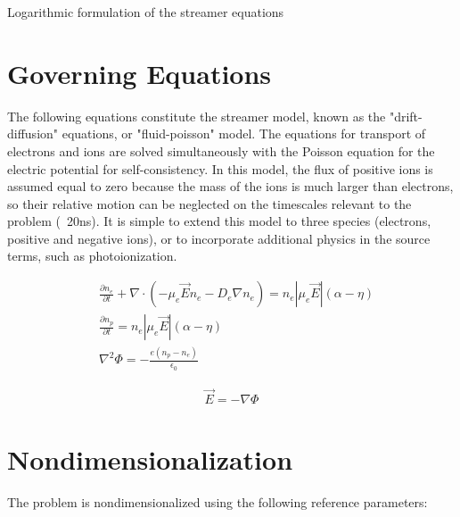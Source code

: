 \documentclass[11pt]{article}
\begin{document}




\centerline{ Logarithmic formulation of the streamer equations}




\noindent

\section{Governing Equations}

The following equations constitute the streamer model, known as the "drift-diffusion" equations, or "fluid-poisson" model. The equations for transport of electrons and ions are solved simultaneously with the Poisson equation for the electric potential for self-consistency. In this model, the flux of positive ions is assumed equal to zero because the mass of the ions is much larger than electrons, so their relative motion can be neglected on the timescales relevant to the problem (~20ns). It is simple to extend this model to three species (electrons, positive and negative ions), or to incorporate additional physics in the source terms, such as photoionization.

\begin{align}
    &\frac{\partial n_e}{\partial t} + \nabla \cdot (-\mu_e\vec{E}n_e - D_e\nabla n_e) = n_e|\mu_e\vec{E}|(\alpha-\eta)\\
    &\frac{\partial n_p}{\partial t} = n_e|\mu_e\vec{E}|(\alpha-\eta)\\
    &\nabla^2\Phi = -\frac{e(n_p-n_e)}{\epsilon_0}
\end{align}

\begin{align}
    \vec{E} = -\nabla\Phi
\end{align}

\section{Nondimensionalization}
The problem is nondimensionalized using the following reference parameters:
\end{document}
